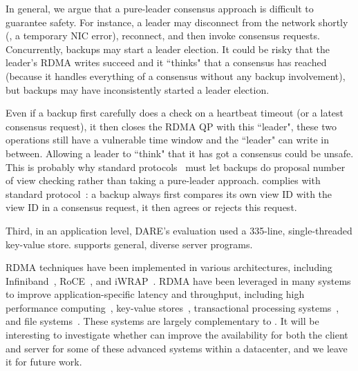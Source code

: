 In general, we argue that a pure-leader consensus approach is difficult to 
guarantee safety. For instance, a leader may disconnect from the network 
shortly (\eg, a temporary NIC error), reconnect, and then invoke 
consensus requests. Concurrently, backups may start a leader election. It could 
be risky that the leader's RDMA writes succeed and it ``thinks" that a 
consensus has reached (because it handles everything of a consensus without any 
backup involvement), but backups may have inconsistently started a leader 
election.

Even if a backup first carefully does a check on a heartbeat timeout (or a 
latest consensus request), it then closes the RDMA QP with this ``leader", 
these two operations still have a vulnerable time window and the ``leader" can 
write in between. Allowing a leader to ``think" that it has got a consensus 
could be unsafe. This is probably why standard \paxos 
protocols~\cite{paxos,paxos:simple,paxos:practical} must let backups do proposal 
number of view checking rather than taking a pure-leader approach. \xxx complies 
with standard \paxos protocol~\cite{paxos:practical}: a \xxx backup always 
first compares its own view ID with the view ID in a consensus request, it then 
agrees or rejects this request.

Third, in an application level, DARE's evaluation used a 335-line, 
single-threaded key-value store. \xxx supports general, diverse server 
programs.





 RDMA techniques have been implemented in various 
architectures, including Infiniband~\cite{infiniband}, RoCE~\cite{roce}, and 
iWRAP~\cite{iwrap}. RDMA have been leveraged in many systems to improve 
application-specific latency and throughput, including high performance 
computing~\cite{openmpi}, key-value 
stores~\cite{pilaf:usenix14,herd:sigcomm14,farm:nsdi14,memcached:rdma}, 
transactional processing systems~\cite{drtm:sosp15,farm:sosp15}, and file 
systems~\cite{gibson:nfs}. These systems are largely complementary to \xxx. It 
will be interesting to investigate whether \xxx can improve the availability for 
both the client and server for some of these advanced systems within a 
datacenter, and we leave it for future work.

